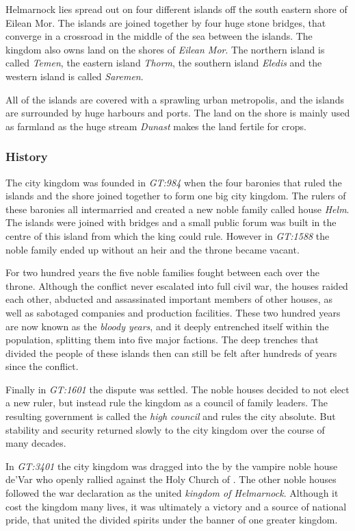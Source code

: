 Helmarnock lies spread out on four different islands off the south eastern
shore of Eilean Mor. The islands are joined together by four huge stone
bridges, that converge in a crossroad in the middle of the sea between the
islands. The kingdom also owns land on the shores of \emph{Eilean Mor}.  The
northern island is called \emph{Temen}, the eastern island \emph{Thorm}, the
southern island \emph{Eledis} and the western island is called \emph{Saremen}.

All of the islands are covered with a sprawling urban metropolis, and the
islands are surrounded by huge harbours and ports. The land on the shore is
mainly used as farmland as the huge stream \emph{Dunast} makes the land
fertile for crops.

\subsubsection{History}

The city kingdom was founded in \emph{GT:984} when the four baronies that
ruled the islands and the shore joined together to form one big city kingdom.
The rulers of these baronies all intermarried and created a new noble family
called house \emph{Helm}. The islands were joined with bridges and a small
public forum was built in the centre of this island from which the king could
rule. However in \emph{GT:1588} the noble family ended up without an heir and
the throne became vacant.

For two hundred years the five noble families fought between each over the
throne. Although the conflict never escalated into full civil war, the houses
raided each other, abducted and assassinated important members of other
houses, as well as sabotaged companies and production facilities. These two
hundred years are now known as the \emph{bloody years}, and it deeply
entrenched itself within the population, splitting them into five major
factions. The deep trenches that divided the people of these islands then can
still be felt after hundreds of years since the conflict.

Finally in \emph{GT:1601} the dispute was settled. The noble houses decided
to not elect a new ruler, but instead rule the kingdom as a council of family
leaders. The resulting government is called the \emph{high council} and rules
the city absolute. But stability and security returned slowly to the city
kingdom over the course of many decades.

In \emph{GT:3401} the city kingdom was dragged into the  by the vampire noble house de'Var who openly rallied against the
Holy Church of . The other noble houses followed the war
declaration as the united \emph{kingdom of Helmarnock}. Although it cost the
kingdom many lives, it was ultimately a victory and a source of national
pride, that united the divided spirits under the banner of one greater
kingdom.

